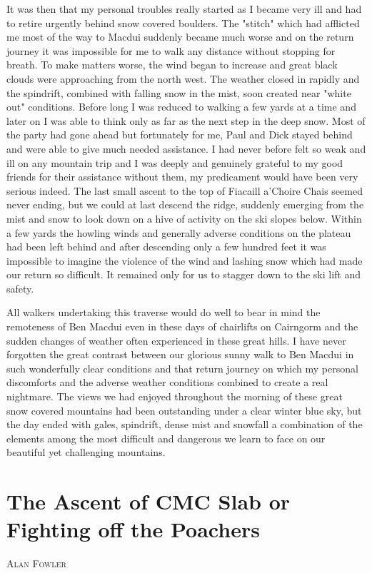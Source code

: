 \documentclass[a5paper,openany,font 10pt]{scrbook}
\makeatletter
\newcommand{\chapterauthor}[1]{%
{\parindent0pt\vspace*{-5pt}%
\linespread{1.1}\large\scshape#1%
\par\nobreak\vspace*{35pt}}
\@afterheading%
}
\makeatother
\begin{document}
It was then that my personal troubles really started as I
became very ill and had to retire urgently behind snow covered
boulders. The "stitch" which had afflicted me most of the way to
Macdui suddenly became much worse and on the return journey it
was impossible for me to walk any distance without stopping for
breath. To make matters worse, the wind began to increase and
great black clouds were approaching from the north west. The
weather closed in rapidly and the spindrift, combined with
falling snow in the mist, soon created near "white out"
conditions. Before long I was reduced to walking a few yards at a
time and later on I was able to think only as far as the next
step in the deep snow. Most of the party had gone ahead but
fortunately for me, Paul and Dick stayed behind and were able to
give much needed assistance. I had never before felt so weak and
ill on any mountain trip and I was deeply and genuinely grateful
to my good friends for their assistance  without them, my
predicament would have been very serious indeed. The last small
ascent to the top of Fiacaill a'Choire Chais seemed never ending,
but we could at last descend the ridge, suddenly emerging from
the mist and snow to look down on a hive of activity on the ski
slopes below. Within a few yards the howling winds and generally
adverse conditions on the plateau had been left behind and  after
descending only a few hundred feet it was impossible to imagine
the violence of the wind and lashing snow which had made our
return so difficult. It remained only for us to stagger down to
the ski lift and safety.

All walkers undertaking this traverse would do well to bear
in mind the remoteness of Ben Macdui  even in these days of
chairlifts on Cairngorm  and the sudden changes of weather often
experienced in these great hills. I have never forgotten the
great contrast between our glorious sunny walk to Ben Macdui in
such wonderfully clear conditions and that return journey on
which my personal discomforts and the adverse weather conditions
combined to create a real nightmare. The views we had enjoyed
throughout the morning of these great snow covered mountains had
been outstanding under a clear winter blue sky, but the day ended
with gales, spindrift, dense mist and snowfall   a combination of
the elements among the most difficult and dangerous we learn to
face on our beautiful yet challenging mountains.

\chapter{The Ascent of CMC Slab or Fighting off the Poachers}
\label{sec:orgebfc557}
\chapterauthor{Alan Fowler}
\end{document}
